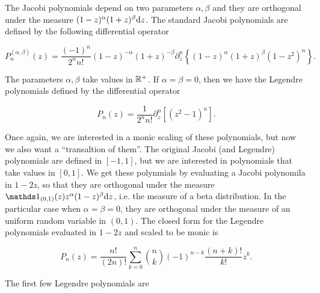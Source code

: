     The Jacobi polynomials depend on two parameters $\alpha,\beta$ and they are orthogonal under the measure $(1-z)^{\alpha}(1+z)^{\beta}\mathrm d z$. The standard Jacobi polynomials are defined by the following differential operator

    \begin{equation*}
        P_{n}^{(\alpha ,\beta )}(z) = \frac{(-1)^{n}}{2^{n}n!}(1-z)^{-\alpha }(1+z)^{-\beta }\partial_z^n \left\{(1-z)^{\alpha }(1+z)^{\beta }\left(1-z^{2}\right)^{n}\right\}.
    \end{equation*}

    The parameters $\alpha,\beta$ take values in $\mathbb R^+$. If $\alpha = \beta = 0$, then we have the Legendre polynomials defined by the differential operator

    \begin{equation*}
        P_{n}(z) = \frac{1}{2^{n}n!}\partial_z^n [(z^{2}-1)^{n}].
    \end{equation*}

    Once again, we are interested in a monic scaling of these polynomials, but now we also want a ``transaltion of them''. The original Jacobi (and Legendre) polynomials are defined in $[-1,1]$, but we are interested in polynomials that take values in $[0,1]$. We get these polynmials by evaluating a Jacobi polynomila in $1-2z$, so that they are orthogonal under the measure $\mathds 1_{(0,1)}(z)z^\alpha(1-z)^\beta \d z$, i.e. the measure of a beta distribution. In the particular case when $\alpha = \beta = 0$, they are orthogonal under the measure of an uniform random variable in $(0,1)$. The closed form for the Legendre polynomials evaluated in $1-2z$ and scaled to be monic is

    \begin{equation*}
        P_n(z) = \frac{n!}{(2n)!} \sum_{k=0}^n \binom nk (-1)^{n-k} \frac{(n+k)!}{k!} z^k.
    \end{equation*}

    The first few Legendre polynomials are

